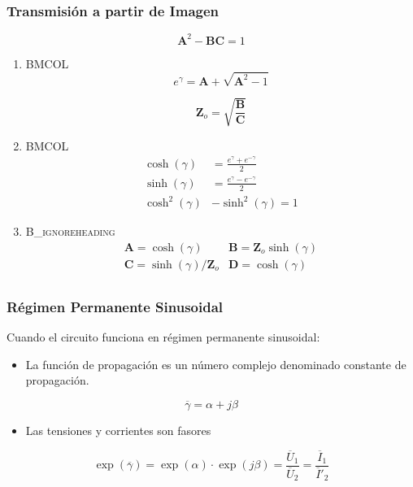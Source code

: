 \subsubsection{Transmisión a partir de Imagen}
\label{sec:org593cab5}

\[
\mathbf{A}^2 - \mathbf{B}\mathbf{C} = 1
\]

\begin{enumerate}
\item \hfill{}\textsc{BMCOL}
\label{sec:orgbfdda51}
\[
  e^\gamma = \mathbf{A} + \sqrt{\mathbf{A}^2 - 1}
\]

\[
  \mathbf{Z}_o = \sqrt{\frac{\mathbf{B}}{\mathbf{C}}}
\]

\item \hfill{}\textsc{BMCOL}
\label{sec:orgbb55298}
\begin{align*}
  \cosh(\gamma) &= \frac{e^\gamma + e^{-\gamma}}{2}\\
  \sinh(\gamma) &= \frac{e^\gamma - e^{-\gamma}}{2}\\
  \cosh^2(\gamma) &- \sinh^2(\gamma) = 1
\end{align*}

\item \hfill{}\textsc{B\_ignoreheading}
\label{sec:org51374bf}
\[
\boxed{
  \begin{array}{ll}
    \mathbf{A} = \cosh(\gamma) &
    \mathbf{B} = \mathbf{Z}_o \sinh(\gamma)\\
    \mathbf{C} = \sinh(\gamma)/\mathbf{Z}_o &
    \mathbf{D} = \cosh(\gamma)\\
  \end{array}
}
\]
\end{enumerate}

\subsubsection{Régimen Permanente Sinusoidal}
\label{sec:orgde43a7b}

Cuando el circuito funciona en régimen permanente sinusoidal:

\begin{itemize}
\item La función de propagación es un número complejo denominado constante de propagación.
\end{itemize}
\[
  \overline{\gamma} = \alpha + j\beta
\]
\begin{itemize}
\item Las tensiones y corrientes son fasores
\end{itemize}
\[
  \exp(\overline{\gamma}) = \exp(\alpha) \cdot \exp(j\beta) = \frac{\overline{U}_1}{\overline{U}_2} = \frac{\overline{I}_1}{\overline{I}'_2}
\]

